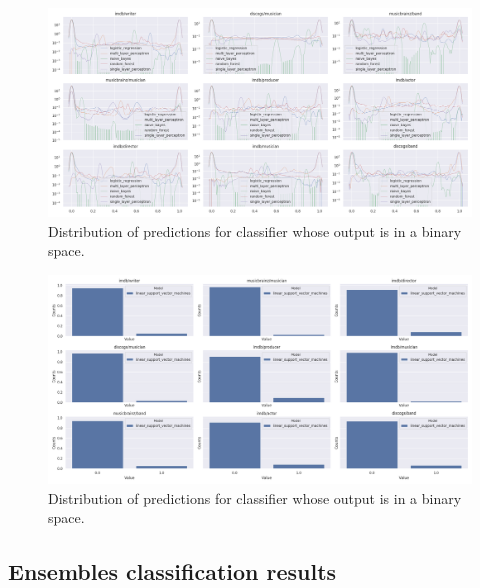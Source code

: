 \documentclass[epsfig,a4paper,11pt,titlepage,twoside,openany]{book}
\begin{document}
\begin{figure}[]
  \centering \includegraphics[width=\textwidth]{baseline_classification_continuous_classifiers_distplots} 
  \caption{Distribution of predictions for classifier whose output is in a binary space.}
  \label{fig:apx-baseline-classification-barplot}
\end{figure}

\begin{figure}[]
  \centering \includegraphics[width=\textwidth]{baseline_classification_binary_classifiers_barplot} 
  \caption{Distribution of predictions for classifier whose output is in a binary space.}
  \label{fig:apx-baseline-classification-barplot}
\end{figure}


\subsection{Ensembles classification results}
\label{sec:apx-ensembles-classification-results}
\end{document}
